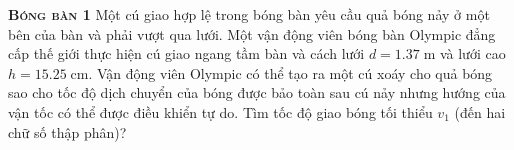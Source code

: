 
\begin{problem}{\textbf{\textsc{Bóng bàn 1}}} Một cú giao hợp lệ trong bóng bàn yêu cầu quả bóng nảy ở một bên của bàn và phải vượt qua lưới. Một vận động viên bóng bàn Olympic đẳng cấp thế giới thực hiện cú giao ngang tầm bàn và cách lưới $d=1.37\;\mathrm{m}$ và lưới cao $h=15.25\;\mathrm{cm}$. Vận động viên Olympic có thể tạo ra một cú xoáy cho quả bóng sao cho tốc độ dịch chuyển của bóng được bảo toàn sau cú nảy nhưng hướng của vận tốc có thể được điều khiển tự do. Tìm tốc độ giao bóng tối thiểu $v_1$ (đến hai chữ số thập phân)?
	
\end{problem}
